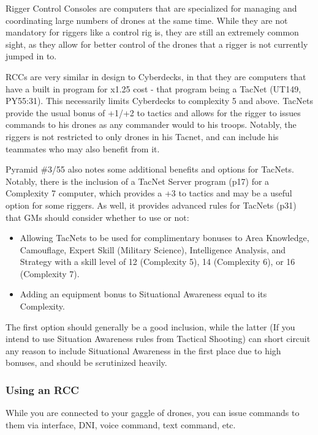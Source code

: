 \begin{multicols*}{3}
	Rigger Control Consoles are computers that are specialized for managing and coordinating large numbers of drones at the same time. While they are not mandatory for riggers like a control rig is, they are still an extremely common sight, as they allow for better control of the drones that a rigger is not currently jumped in to.
	
	RCCs are very similar in design to Cyberdecks, in that they are computers that have a built in program for x1.25 cost - that program being a TacNet (UT149, PY55:31). This necessarily limits Cyberdecks to complexity 5 and above. TacNets provide the usual bonus of +1/+2 to tactics and allows for the rigger to issues commands to his drones as any commander would to his troops. Notably, the riggers is not restricted to only drones in his Tacnet, and can include his teammates who may also benefit from it.
	
	Pyramid \#3/55 also notes some additional benefits and options for TacNets. Notably, there is the inclusion of a TacNet Server program (p17) for a Complexity 7 computer, which provides a +3 to tactics and may be a useful option for some riggers. As well, it provides advanced rules for TacNets (p31) that GMs should consider whether to use or not:
	
	\begin{itemize}
		\itemsep 0pt
		\item Allowing TacNets to be used for complimentary bonuses to Area Knowledge, Camouflage, Expert Skill (Military Science), Intelligence Analysis, and Strategy with a skill level of 12 (Complexity 5), 14 (Complexity 6), or 16 (Complexity 7).
		\item Adding an equipment bonus to Situational Awareness equal to its Complexity.
	\end{itemize}
	
	The first option should generally be a good inclusion, while the latter (If you intend to use Situation Awareness rules from Tactical Shooting) can short circuit any reason to include Situational Awareness in the first place due to high bonuses, and should be scrutinized heavily.
	
	\subsubsection{Using an RCC}
	
	While you are connected to your gaggle of drones, you can issue commands to them via interface, DNI, voice command, text command, etc. 
	

\end{multicols*}
